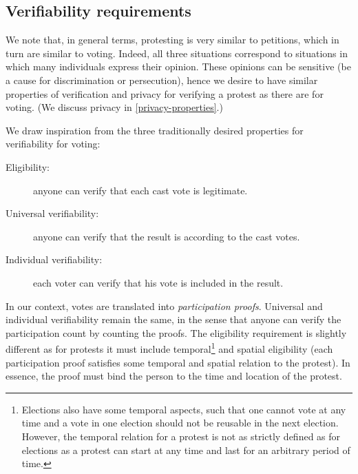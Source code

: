 \subsection{Verifiability requirements}%
\label{verifiability-properties}

We note that, in general terms, protesting is very similar to petitions, which in turn are similar to voting.
Indeed, all three situations correspond to situations in which many individuals express their opinion.
These opinions can be sensitive (\eg be a cause for discrimination or persecution), hence we desire to have similar properties of verification and privacy for verifying a protest as there are for voting.
(We discuss privacy in \cref{privacy-properties}.)

We draw inspiration from the three traditionally desired properties for verifiability for voting:
\begin{description}
  \item[Eligibility:] anyone can verify that each cast vote is legitimate.
  \item[Universal verifiability:] anyone can verify that the result is according to the cast votes.
  \item[Individual verifiability:] each voter can verify that his vote is included in the result.
\end{description}
In our context, votes are translated into \emph{participation proofs}.
Universal and individual verifiability remain the same, in the sense that anyone can verify the participation count by counting the proofs.
The eligibility requirement is slightly different as for protests it must include temporal\footnote{
Elections also have some temporal aspects, such that one cannot vote at any time and a vote in one election should not be reusable in the next election.
However, the temporal relation for a protest is not as strictly defined as for elections as a protest can start at any time and last for an arbitrary period of time.}
and spatial eligibility (\ie each participation proof satisfies some temporal and spatial relation to the protest).
In essence, the proof must bind the person to the time and location of the protest.

